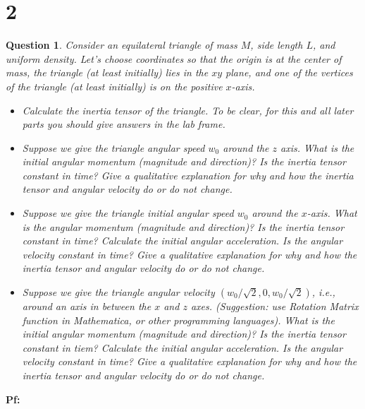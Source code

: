\documentclass{article}
\newtheorem{question}{Question}
\begin{document}
\section*{2}
\begin{question}\label{q2}
    Consider an equilateral triangle of mass $M$, side length $L$, and uniform density. Let's choose coordinates so that the origin is at the center of mass, the triangle (at least initially) lies in the $xy$ plane, and one of the vertices of the triangle (at least initially) is on the positive $x$-axis.
    \begin{itemize}
        \item[(a)] Calculate the inertia tensor of the triangle. To be clear, for this and all later parts you should give answers in the lab frame.
        \item[(b)] Suppose we give the triangle angular speed $w_0$ around the $z$ axis. What is the initial angular momentum (magnitude and direction)? Is the inertia tensor constant in time? Give a qualitative explanation for why and how the inertia tensor and angular velocity do or do not change.
        \item[(c)] Suppose we give the triangle initial angular speed $w_0$ around the $x$-axis. What is the angular momentum (magnitude and direction)? Is the inertia tensor constant in time? Calculate the initial angular acceleration. Is the angular velocity constant in time? Give a qualitative explanation for why and how the inertia tensor and angular velocity do or do not change.
        \item[(d)] Suppose we give the triangle angular velocity $(w_0/\sqrt{2},0,w_0/\sqrt{2})$, i.e., around an axis in between the $x$ and $z$ axes. (Suggestion: use Rotation Matrix function in Mathematica, or other programming languages). What is the initial angular momentum (magnitude and direction)? Is the inertia tensor constant in tiem? Calculate the initial angular acceleration. Is the angular velocity constant in time? Give a qualitative explanation for why and how the inertia tensor and angular velocity do or do not change. 
    \end{itemize}
\end{question}

\textbf{Pf:}

\break
\end{document}
